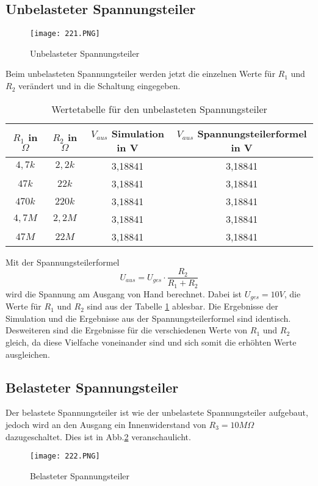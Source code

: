 \subsection{Unbelasteter Spannungsteiler}
\begin{figure}[h!]
\centering
\texttt{[image: 221.PNG]}
\caption{Unbelasteter Spannungsteiler}
\label{fig: Unbelasteter Spannungsteiler}
\end{figure}
Beim unbelasteten Spannungsteiler  werden jetzt die einzelnen Werte für $R_1$ und $R_2$ verändert und in die Schaltung eingegeben.

\begin{table}[h!]
\centering
\caption{Wertetabelle für den unbelasteten Spannungsteiler }
\label{fig: unbelasteter Spannungsteiler}
\begin{tabular}{|c|c|c|c|} \hline
$R_1$ in $\Omega$ & $R_2$ in $\Omega$ & $V_{aus}$ Simulation in V & $V_{aus}$ Spannungsteilerformel in V\\ \hline
$4,7k$ & $2,2k$ & 3,18841 & 3,18841\\ \hline
$47k$ & $22k$ & 3,18841 & 3,18841\\ \hline
$470k$ & $220k$ & 3,18841 & 3,18841\\ \hline
$4,7M$ & $2,2M$ & 3,18841 & 3,18841\\ \hline
$47M$ & $22M$ & 3,18841 & 3,18841\\ \hline

\end{tabular}
\end{table}

Mit der Spannungsteilerformel 
\begin{equation}
U_{aus}=U_{ges}\cdot \frac{R_2}{R_1+R_2}
\end{equation}
wird die Spannung am Ausgang von Hand berechnet. Dabei ist $U_{ges}=10V$, die Werte für $R_1$ und $R_2$ sind aus der Tabelle \ref{fig: unbelasteter Spannungsteiler} ablesbar.
Die Ergebnisse der Simulation und die Ergebnisse aus der Spannungsteilerformel sind identisch. Desweiteren sind die Ergebnisse für die verschiedenen Werte von $R_1$ und $R_2$ gleich, da diese Vielfache voneinander sind und sich somit die erhöhten Werte ausgleichen.

\subsection{Belasteter Spannungsteiler}
Der belastete Spannungsteiler ist wie der unbelastete Spannungsteiler aufgebaut, jedoch wird an den Ausgang ein Innenwiderstand von $R_3=10M\Omega$ dazugeschaltet. Dies ist in Abb.\ref{fig: bel.Spannungsteiler} veranschaulicht.
\begin{figure}[h!]
\centering
\texttt{[image: 222.PNG]}
\caption{Belasteter Spannungsteiler}
\label{fig: bel.Spannungsteiler}
\end{figure}

